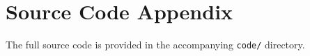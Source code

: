 \section{Source Code Appendix}

The full source code is provided in the accompanying \texttt{code/} directory.

% 
